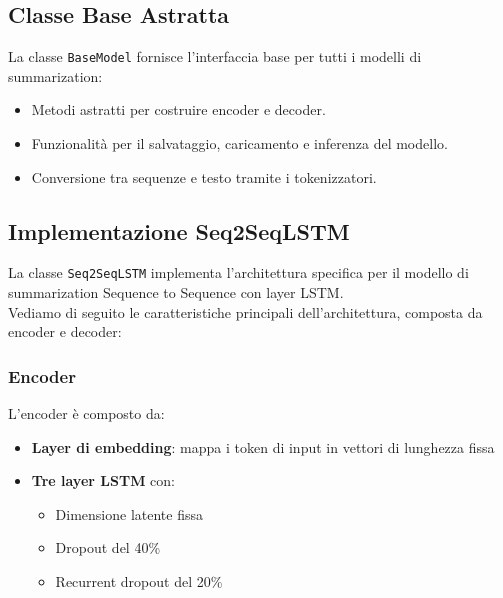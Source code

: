 \documentclass[a4paper, 12pt]{article}
\begin{document}
\subsection{Classe Base Astratta}
La classe \texttt{BaseModel} fornisce l'interfaccia base per tutti i modelli di summarization:
\begin{itemize}
    \item Metodi astratti per costruire encoder e decoder.
    \item Funzionalità per il salvataggio, caricamento e inferenza del modello.
    \item Conversione tra sequenze e testo tramite i tokenizzatori.
\end{itemize}

\subsection{Implementazione Seq2SeqLSTM}
La classe \texttt{Seq2SeqLSTM} implementa l'architettura specifica per il modello di summarization Sequence to Sequence con layer LSTM.\\
Vediamo di seguito le caratteristiche principali dell'architettura, composta da encoder e decoder:

\subsubsection{Encoder}
L'encoder è composto da:
\begin{itemize}
    \item \textbf{Layer di embedding}: mappa i token di input in vettori di lunghezza fissa
    \item \textbf{Tre layer LSTM} con:
        \begin{itemize}
            \item Dimensione latente fissa
            \item Dropout del 40\% 
            \item Recurrent dropout del 20\% 
        \end{itemize}
\end{itemize}
\end{document}
